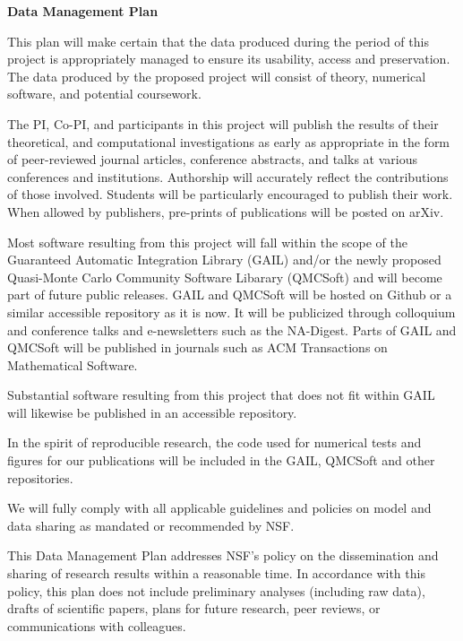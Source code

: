 \documentclass[11pt]{NSFamsart}
\begin{document}

\centerline{\textbf{\Large Data Management Plan}}

\bigskip



This plan will make certain that the data produced during the period of this project is appropriately managed to ensure its usability, access and preservation.  The data produced by the proposed project will consist of theory, numerical software, and potential coursework. 

The PI, Co-PI, and participants in this project will publish the results of their theoretical, and 
computational investigations as early as appropriate in the form of peer-reviewed journal articles, 
conference abstracts, and talks at various conferences and institutions. Authorship will accurately 
reflect the contributions of those involved.  Students will be particularly encouraged to publish their 
work. When allowed by publishers, pre-prints of publications will be posted on arXiv.

Most software resulting from this project will fall within the scope of the Guaranteed Automatic 
Integration Library (GAIL) and/or the newly proposed Quasi-Monte Carlo Community Software Libarary (QMCSoft) and will become part of future public releases.  GAIL and QMCSoft will be hosted on 
Github or a similar accessible repository as it is now.  It will be publicized through colloquium and 
conference talks and e-newsletters such as the NA-Digest.  Parts of GAIL and QMCSoft will be published in journals such as ACM Transactions on Mathematical Software.

Substantial software resulting from this project that does not fit within GAIL will likewise be 
published in an accessible repository.

In the spirit of reproducible research, the code used for numerical tests and figures for our 
publications will be included in the GAIL, QMCSoft and other repositories.

We will fully comply with all applicable guidelines and policies on model and data sharing as mandated or recommended by NSF.

This Data Management Plan addresses NSF’s policy on the dissemination and sharing of research results within a reasonable time.  In accordance with this policy, this plan does not include preliminary analyses (including raw data), drafts of scientific papers, plans for future research, peer reviews, or communications with colleagues. 
\end{document}
